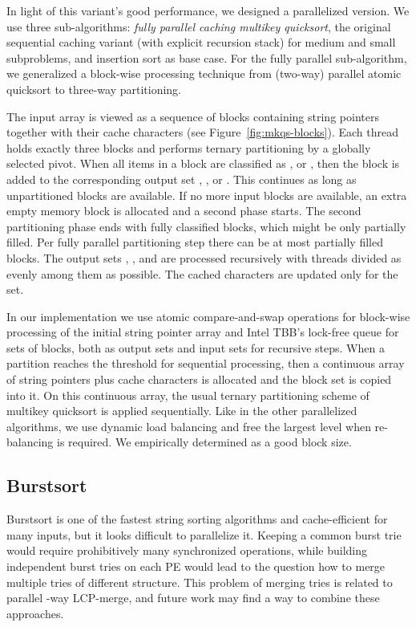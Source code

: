 \documentclass[a4paper]{myjournal}
\begin{document}
In light of this variant's good performance, we designed a parallelized
version. We use three sub-algorithms: \emph{fully parallel caching multikey
  quicksort}, the original sequential caching variant (with explicit recursion
stack) for medium and small subproblems, and insertion sort as base case. For
the fully parallel sub-algorithm, we generalized a block-wise processing
technique from (two-way) parallel atomic quicksort \cite{tsigas2003simple} to
three-way partitioning.

The input array is viewed as a sequence of blocks containing  string pointers
together with their  cache characters (see
Figure~\ref{fig:mkqs-blocks}). Each thread holds exactly three blocks and
performs ternary partitioning by a globally selected pivot. When all items in a
block are classified as ,  or , then the block is added to the
corresponding output set , , or . This
continues as long as unpartitioned blocks are available. If no more input blocks
are available, an extra empty memory block is allocated and a second phase
starts. The second partitioning phase ends with fully classified blocks, which
might be only partially filled. Per fully parallel partitioning step there can
be at most  partially filled blocks. The output sets ,
, and  are processed recursively with threads divided as
evenly among them as possible. The cached characters are updated only for the
 set.

In our implementation we use atomic compare-and-swap operations for block-wise
processing of the initial string pointer array and Intel TBB's lock-free queue
for sets of blocks, both as output sets and input sets for recursive steps. When
a partition reaches the threshold for sequential processing, then a continuous
array of string pointers plus cache characters is allocated and the block set is
copied into it. On this continuous array, the usual ternary partitioning scheme
of multikey quicksort is applied sequentially. Like in the other parallelized
algorithms, we use dynamic load balancing and free the largest level when
re-balancing is required. We empirically determined  as a
good block size.

\subsection{Burstsort}\label{sec:para-burstsort}

Burstsort is one of the fastest string sorting algorithms and cache-efficient
for many inputs, but it looks difficult to parallelize it. Keeping a common
burst trie would require prohibitively many synchronized operations, while
building independent burst tries on each PE would lead to the question how to
merge multiple tries of different structure.  This problem of merging tries is
related to parallel -way LCP-merge, and future work may find a way to combine
these approaches.
\end{document}

